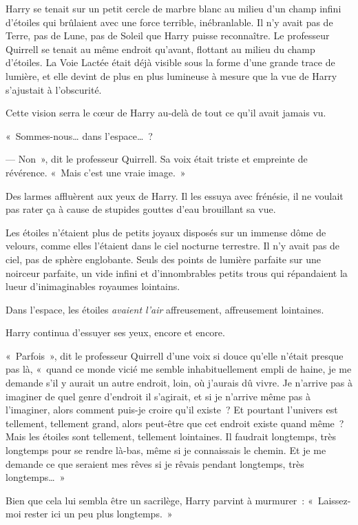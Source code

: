 Harry se tenait sur un petit cercle de marbre blanc au milieu d'un champ infini d'étoiles qui brûlaient avec une force terrible, inébranlable.
Il n'y avait pas de Terre, pas de Lune, pas de Soleil que Harry puisse reconnaître.
Le professeur Quirrell se tenait au même endroit qu'avant, flottant au milieu du champ d'étoiles.
La Voie Lactée était déjà visible sous la forme d'une grande trace de lumière, et elle devint de plus en plus lumineuse à mesure que la vue de Harry s'ajustait à l'obscurité.

Cette vision serra le cœur de Harry au-delà de tout ce qu'il avait jamais vu.

«~Sommes-nous… dans l'espace…~?

--- Non~», dit le professeur Quirrell.
Sa voix était triste et empreinte de révérence.
«~Mais c'est une vraie image.~»

Des larmes affluèrent aux yeux de Harry.
Il les essuya avec frénésie, il ne voulait pas rater ça à cause de stupides gouttes d'eau brouillant sa vue.

Les étoiles n'étaient plus de petits joyaux disposés sur un immense dôme de velours, comme elles l'étaient dans le ciel nocturne terrestre.
Il n'y avait pas de ciel, pas de sphère englobante.
Seuls des points de lumière parfaite sur une noirceur parfaite, un vide infini et d'innombrables petits trous qui répandaient la lueur d'inimaginables royaumes lointains.

Dans l'espace, les étoiles \emph{avaient l'air} affreusement, affreusement lointaines.

Harry continua d'essuyer ses yeux, encore et encore.

«~Parfois~», dit le professeur Quirrell d'une voix si douce qu'elle n'était presque pas là, «~quand ce monde vicié me semble inhabituellement empli de haine, je me demande s'il y aurait un autre endroit, loin, où j'aurais dû vivre.
Je n'arrive pas à imaginer de quel genre d'endroit il s'agirait, et si je n'arrive même pas à l'imaginer, alors comment puis-je croire qu'il existe~?
Et pourtant l'univers est tellement, tellement grand, alors peut-être que cet endroit existe quand même~?
Mais les étoiles sont tellement, tellement lointaines.
Il faudrait longtemps, très longtemps pour se rendre là-bas, même si je connaissais le chemin.
Et je me demande ce que seraient mes rêves si je rêvais pendant longtemps, très longtemps…~»

Bien que cela lui sembla être un sacrilège, Harry parvint à murmurer~: «~Laissez-moi rester ici un peu plus longtemps.~»


